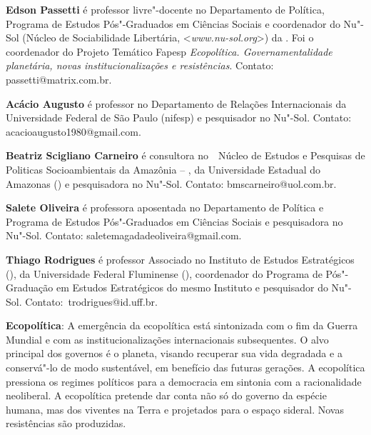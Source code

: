 \textbf{Edson Passetti} é professor livre"-docente no Departamento de Política, Programa de Estudos Pós"-Graduados em Ciências Sociais e coordenador do Nu"-Sol (Núcleo de Sociabilidade Libertária, \textless{}\emph{www.nu-sol.org}\textgreater{}) da . Foi o coordenador do Projeto Temático Fapesp \emph{Ecopolítica. Governamentalidade planetária, novas institucionalizações e resistências}. Contato: passetti@matrix.com.br.

\textbf{Acácio Augusto} é professor no Departamento de Relações Internacionais da Universidade Federal de São Paulo (nifesp) e pesquisador no Nu"-Sol. Contato: acacioaugusto1980@gmail.com.

\textbf{Beatriz Scigliano Carneiro} é consultora no  Núcleo de Estudos e Pesquisas de Politicas Socioambientais da Amazônia -- , da Universidade Estadual do Amazonas () e pesquisadora no Nu"-Sol. Contato: bmscarneiro@uol.com.br.

\textbf{Salete Oliveira} é professora aposentada no Departamento de Política e Programa de Estudos Pós"-Graduados em Ciências Sociais e pesquisadora no Nu"-Sol. Contato: saletemagadadeoliveira@gmail.com.

\textbf{Thiago Rodrigues} é professor Associado no Instituto de Estudos Estratégicos (), da Universidade Federal Fluminense (), coordenador do Programa de Pós"-Graduação em Estudos Estratégicos do mesmo Instituto e pesquisador do Nu"-Sol. Contato: trodrigues@id.uff.br.

\textbf{Ecopolítica}: A emergência da ecopolítica está sintonizada com o fim da  Guerra Mundial e com as institucionalizações internacionais subsequentes. O alvo principal dos governos é o planeta, visando recuperar sua vida degradada e a conservá"-lo de modo sustentável, em benefício das futuras gerações. A ecopolítica pressiona os regimes políticos para a democracia em sintonia com a racionalidade neoliberal. A ecopolítica pretende dar conta não só do governo da espécie humana, mas dos viventes na Terra e projetados para o espaço sideral. Novas resistências são produzidas. 




